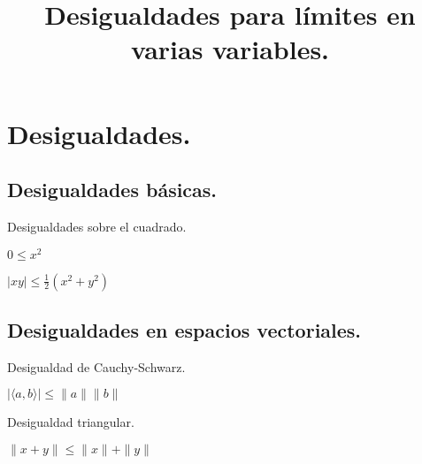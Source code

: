 \documentclass{article}
\title{Desigualdades para límites en varias variables.}
\author{}
\begin{document}
\maketitle

\section{Desigualdades.}

\subsection{Desigualdades básicas.}
\noindent Desigualdades sobre el cuadrado.
\begin{center}
 $\displaystyle 0 \leq x^2$
\end{center}
\begin{center}
 $\displaystyle |xy| \leq \frac{1}{2}\left(x^2+y^2\right)$
\end{center}



\subsection{Desigualdades en espacios vectoriales.}
\noindent Desigualdad de Cauchy-Schwarz.
\begin{center}
 $\displaystyle |{\langle a,b \rangle}| \leq \|a\|\|b\|$
\end{center}

\noindent Desigualdad triangular.
\begin{center}
 $\displaystyle \|x+y\| \leq \|x\|+\|y\|$
\end{center}
\end{document}
